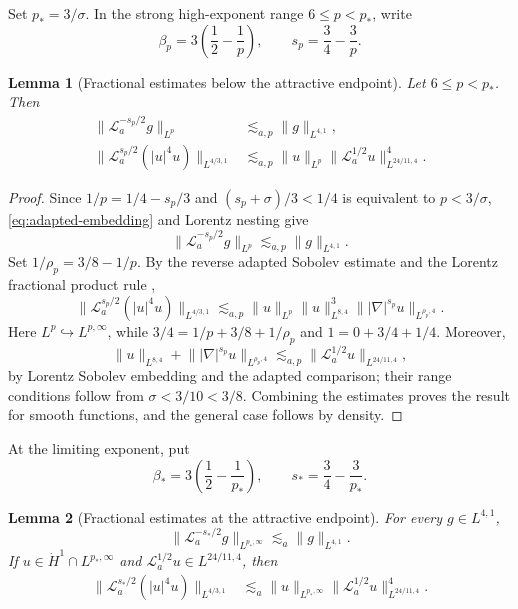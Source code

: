 \documentclass[preprint,12pt]{elsarticle}
\numberwithin{equation}{section}
\newtheorem{lemma}{Lemma}[section]
\theoremstyle{definition}
\theoremstyle{remark}
\newcommand{\cL}{\mathcal L}
\newcommand{\norm}[2]{\lVert #1\rVert_{#2}}
\begin{document}
Set $p_*=3/\sigma$. In the strong high-exponent range
$6\leq p<p_*$, write
\[
 \beta_p=3\left(\frac12-\frac1p\right),
 \qquad s_p=\frac34-\frac3p.
\]

\begin{lemma}[Fractional estimates below the attractive endpoint]
\label{lem:high-fractional}
Let $6\leq p<p_*$. Then
\begin{align}
 \norm{\cL_a^{-s_p/2}g}{L^p}
 &\lesssim_{a,p}\norm{g}{L^{4,1}},
 \label{eq:fractional-inverse}\\
 \norm{\cL_a^{s_p/2}(|u|^4u)}{L^{4/3,1}}
 &\lesssim_{a,p}
 \norm{u}{L^p}
 \norm{\cL_a^{1/2}u}{L^{24/11,4}}^4.
 \label{eq:fractional-nonlinear}
\end{align}
\end{lemma}


\begin{proof}
	Since $1/p=1/4-s_p/3$ and
	$(s_p+\sigma)/3<1/4$ is equivalent to $p<3/\sigma$,
	\eqref{eq:adapted-embedding} and Lorentz nesting give
	\[
	\norm{\cL_a^{-s_p/2}g}{L^p}
	\lesssim_{a,p}\norm{g}{L^{4,1}}.
	\]
	Set $1/\rho_p=3/8-1/p$.  By the reverse adapted Sobolev estimate and
	the Lorentz fractional product rule
	\cite[Lemma~3.8 and Corollary~3.9]{AnKimRyu},
	\[
	\norm{\cL_a^{s_p/2}(|u|^4u)}{L^{4/3,1}}
	\lesssim_{a,p}
	\norm{u}{L^p}\norm{u}{L^{8,4}}^3
	\norm{|\nabla|^{s_p}u}{L^{\rho_p,4}}.
	\]
	Here $L^p\hookrightarrow L^{p,\infty}$, while
	$3/4=1/p+3/8+1/\rho_p$ and $1=0+3/4+1/4$.  Moreover,
	\[
	\norm{u}{L^{8,4}}+
	\norm{|\nabla|^{s_p}u}{L^{\rho_p,4}}
	\lesssim_{a,p}
	\norm{\cL_a^{1/2}u}{L^{24/11,4}},
	\]
	by Lorentz Sobolev embedding and the adapted comparison; their range
	conditions follow from $\sigma<3/10<3/8$.  Combining the estimates
	proves the result for smooth functions, and the general case follows
	by density.
\end{proof}






















At the limiting exponent, put
\[
 \beta_*=3\left(\frac12-\frac1{p_*}\right),
 \qquad s_*=\frac34-\frac3{p_*}.
\]

\begin{lemma}[Fractional estimates at the attractive endpoint]
\label{lem:endpoint-fractional}
For every $g\in L^{4,1}$,
\begin{equation}
 \norm{\cL_a^{-s_*/2}g}{L^{p_*,\infty}}
 \lesssim_a\norm{g}{L^{4,1}}.
 \label{eq:endpoint-fractional-inverse}
\end{equation}
If $u\in\dot H^1\cap L^{p_*,\infty}$ and
$\cL_a^{1/2}u\in L^{24/11,4}$, then
\begin{align}
 \norm{\cL_a^{s_*/2}(|u|^4u)}{L^{4/3,1}}
 &\lesssim_a
 \norm{u}{L^{p_*,\infty}}
 \norm{\cL_a^{1/2}u}{L^{24/11,4}}^4.
 \label{eq:endpoint-fractional-nonlinear}
\end{align}
\end{lemma}
\end{document}
